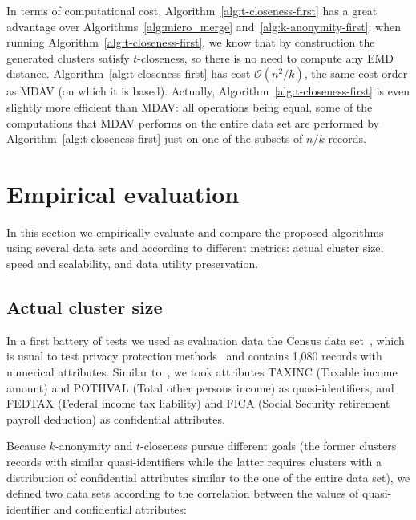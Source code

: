 \documentclass[10pt,journal,compsoc]{IEEEtran}
\theoremstyle{definition}
\theoremstyle{plain}
\begin{document}
In terms of computational cost, Algorithm~\ref{alg:t-closeness-first} has a great advantage over 
 Algorithms~\ref{alg:micro_merge} and~\ref{alg:k-anonymity-first}: when running
 Algorithm~\ref{alg:t-closeness-first}, we know that by
construction the generated clusters satisfy $t$-closeness, so there is no need to compute any EMD distance. Algorithm~\ref{alg:t-closeness-first}
 has cost $\mathcal{O}(n^2/k)$, the same cost order as MDAV (on which 
it is based). Actually,
 Algorithm~\ref{alg:t-closeness-first} is even slightly more efficient 
than MDAV: all operations being
 equal, some of the computations that MDAV performs on the entire data set are performed by 
 Algorithm~\ref{alg:t-closeness-first} just on one of the 
subsets of $n/k$ records.



\section{Empirical evaluation}
\label{sec:empirical}

In this section we empirically evaluate and compare
the proposed algorithms using several data sets and according
to different metrics: actual cluster size, 
speed and scalability, and data utility preservation. 

\subsection{Actual cluster size}
\label{sec:behavior}

In a first battery of tests we used as evaluation data 
the Census data set~\cite{Brand}, which is usual to test 
privacy protection methods~\cite{Yanc02,Lasz05,Domingo10}
and contains 1,080 records with numerical attributes. 
Similar to~\cite{Domingo10}, we took attributes
TAXINC (Taxable income amount) and POTHVAL (Total other persons income)
as quasi-identifiers, and FEDTAX (Federal income tax liability)
and FICA (Social Security retirement payroll deduction)
as confidential attributes. 

Because $k$-anonymity and $t$-closeness pursue different goals
(the former clusters records with similar quasi-identifiers while 
the latter requires clusters with a distribution of 
confidential attributes similar to the one of the entire data set),
we defined two data sets according to the
correlation between the values of quasi-identifier and confidential attributes:
\end{document}
